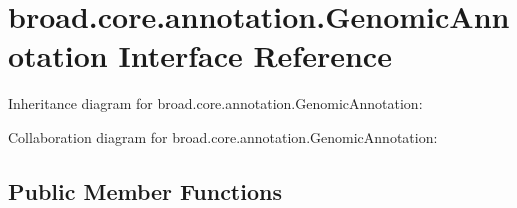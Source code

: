 \hypertarget{interfacebroad_1_1core_1_1annotation_1_1_genomic_annotation}{\section{broad.\+core.\+annotation.\+Genomic\+Annotation Interface Reference}
\label{interfacebroad_1_1core_1_1annotation_1_1_genomic_annotation}
}


Inheritance diagram for broad.\+core.\+annotation.\+Genomic\+Annotation\+:


Collaboration diagram for broad.\+core.\+annotation.\+Genomic\+Annotation\+:
\subsection*{Public Member Functions}
